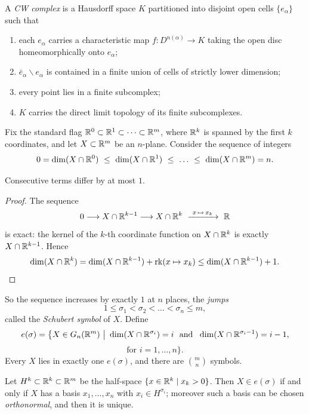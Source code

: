 \begin{definition}
A \emph{CW complex} is a Hausdorff space $K$ partitioned into disjoint open
cells $\{e_\alpha\}$ such that

\begin{enumerate}
\item each $e_\alpha$ carries a characteristic map
$f\colon D^{n(\alpha)}\to K$ taking the open disc homeomorphically onto
$e_\alpha$;
\item $\bar e_\alpha\smallsetminus e_\alpha$ is contained in a finite union of
cells of strictly lower dimension;
\item every point lies in a finite subcomplex;
\item $K$ carries the direct limit topology of its finite subcomplexes.
\end{enumerate}
\end{definition}

Fix the standard flag $\mathbb{R}^0\subset\mathbb{R}^1\subset\dots\subset\mathbb{R}^m$, where $\mathbb{R}^k$ is
spanned by the first $k$ coordinates, and let $X\subset\mathbb{R}^m$ be an $n$-plane.
Consider the sequence of integers
\[
0=\dim(X\cap\R^0)\ \le\ \dim(X\cap\R^1)\ \le\ \dots\ \le\ \dim(X\cap\R^m)=n .
\]

\begin{claim}\label{claim:jumps}
Consecutive terms differ by at most $1$.
\end{claim}

\begin{proof}
The sequence
\[
0\longrightarrow X\cap\mathbb{R}^{k-1}\longrightarrow X\cap\mathbb{R}^{k}
\ \xrightarrow{\ x\,\mapsto\, x_k\ }\ \mathbb{R}
\]
is exact: the kernel of the $k$-th coordinate function on $X\cap\mathbb{R}^k$ is exactly
$X\cap\mathbb{R}^{k-1}$. Hence
\[
\dim(X\cap\mathbb{R}^k)=\dim(X\cap\mathbb{R}^{k-1})+\operatorname{rk}(x\mapsto x_k)
\le\dim(X\cap\mathbb{R}^{k-1})+1 .
\]
\end{proof}

So the sequence increases by exactly $1$ at $n$ places, the \emph{jumps}
\[
1\le\sigma_1<\sigma_2<\dots<\sigma_n\le m,
\]
called the \emph{Schubert symbol} of $X$. Define
\[
e(\sigma)=\big\{X\in G_n(\R^m)\ \big|\
\dim(X\cap\R^{\sigma_i})=i \ \text{ and }\
\dim(X\cap\R^{\sigma_i-1})=i-1,
\]
\[
\text{for } i=1,\dots,n\big\}.
\]
Every $X$ lies in exactly one $e(\sigma)$, and there are $\binom{m}{n}$ symbols.

\begin{claim}\label{claim:half-space}
Let $H^{k}\subset\mathbb{R}^k\subset\mathbb{R}^m$ be the half-space
$\{x\in\mathbb{R}^k\mid x_k>0\}$. Then $X\in e(\sigma)$ if and only if $X$ has a basis
$x_1,\dots,x_n$ with $x_i\in H^{\sigma_i}$; moreover such a basis can be chosen
\emph{orthonormal}, and then it is unique.
\end{claim}

